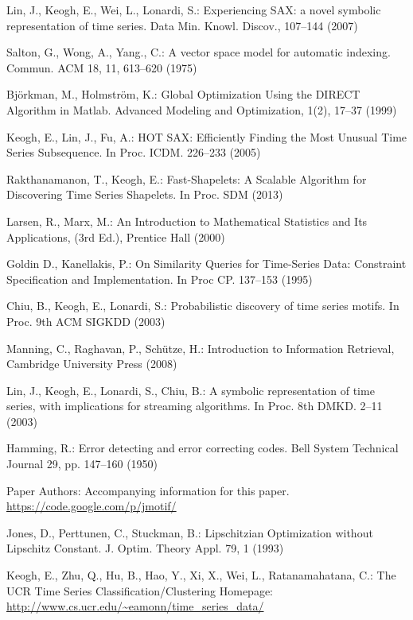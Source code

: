 \documentclass{llncs}
\begin{document}
\begin{thebibliography}{5}
Lin, J., Keogh, E., Wei, L., Lonardi, S.:
Experiencing SAX: a novel symbolic representation of time series.
Data Min. Knowl. Discov., 107--144 (2007)

Salton, G., Wong, A., Yang., C.:
A vector space model for automatic indexing. 
Commun. ACM 18, 11, 613--620 (1975)

Bj\"{o}rkman, M., Holmstr\"{o}m, K.:
Global Optimization Using the DIRECT Algorithm in Matlab.
Advanced Modeling and Optimization, 1(2), 17--37 (1999)

Keogh, E., Lin, J., Fu, A.:
HOT SAX: Efficiently Finding the Most Unusual Time Series Subsequence. 
In Proc. ICDM. 226--233 (2005)

Rakthanamanon, T., Keogh, E.:
Fast-Shapelets: A Scalable Algorithm for Discovering Time Series Shapelets.
In Proc. SDM (2013)

Larsen, R., Marx, M.:
An Introduction to Mathematical Statistics and Its Applications, (3rd Ed.),
Prentice Hall (2000)

Goldin D., Kanellakis, P.:
On Similarity Queries for Time-Series Data: Constraint Specification and Implementation. 
In Proc CP. 137--153 (1995)

Chiu, B., Keogh, E., Lonardi, S.:
Probabilistic discovery of time series motifs. 
In Proc. 9th ACM SIGKDD (2003)

Manning, C., Raghavan, P., Sch\"utze, H.: 
Introduction to Information Retrieval, Cambridge University Press (2008)

Lin, J., Keogh, E., Lonardi, S., Chiu, B.:
A symbolic representation of time series, with implications for streaming algorithms. 
In Proc. 8th DMKD. 2--11 (2003)

Hamming, R.:
Error detecting and error correcting codes. 
Bell System Technical Journal 29, pp. 147--160 (1950)

Paper Authors:
Accompanying information for this paper. 
\url{https://code.google.com/p/jmotif/}

Jones, D., Perttunen, C., Stuckman, B.:
Lipschitzian Optimization without Lipschitz Constant.
J. Optim. Theory Appl. 79, 1 (1993)

Keogh, E., Zhu, Q., Hu, B., Hao, Y.,  Xi, X., Wei, L., Ratanamahatana, C.:
The UCR Time Series Classification/Clustering Homepage:
\url{http://www.cs.ucr.edu/~eamonn/time_series_data/}


\end{thebibliography}
\end{document}
